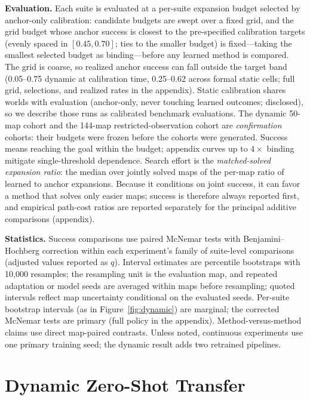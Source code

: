 \documentclass[letterpaper]{article} %
\begin{document}
\textbf{Evaluation.} Each suite is evaluated at a per-suite expansion budget selected by anchor-only calibration: candidate budgets are swept over a fixed grid, and the grid budget whose anchor success is closest to the pre-specified calibration targets (evenly spaced in $[0.45, 0.70]$; ties to the smaller budget) is fixed---taking the smallest selected budget as binding---before any learned method is compared. The grid is coarse, so realized anchor success can fall outside the target band (0.05--0.75 dynamic at calibration time, 0.25--0.62 across formal static cells; full grid, selections, and realized rates in the appendix). Static calibration shares worlds with evaluation (anchor-only, never touching learned outcomes; disclosed), so we describe those runs as calibrated benchmark evaluations. The dynamic 50-map cohort and the 144-map restricted-observation cohort are \emph{confirmation} cohorts: their budgets were frozen before the cohorts were generated. Success means reaching the goal within the budget; appendix curves up to $4\times$ binding mitigate single-threshold dependence. Search effort is the \emph{matched-solved expansion ratio}: the median over jointly solved maps of the per-map ratio of learned to anchor expansions. Because it conditions on joint success, it can favor a method that solves only easier maps; success is therefore always reported first, and empirical path-cost ratios are reported separately for the principal additive comparisons (appendix).

\textbf{Statistics.} Success comparisons use paired McNemar tests with Benjamini--Hochberg correction within each experiment's family of suite-level comparisons (adjusted values reported as $q$). Interval estimates are percentile bootstraps with 10{,}000 resamples; the resampling unit is the evaluation map, and repeated adaptation or model seeds are averaged within maps before resampling; quoted intervals reflect map uncertainty conditional on the evaluated seeds. Per-suite bootstrap intervals (as in Figure~\ref{fig:dynamic}) are marginal; the corrected McNemar tests are primary (full policy in the appendix). Method-versus-method claims use direct map-paired contrasts. Unless noted, continuous experiments use one primary training seed; the dynamic result adds two retrained pipelines.

\section{Dynamic Zero-Shot Transfer}
\end{document}
